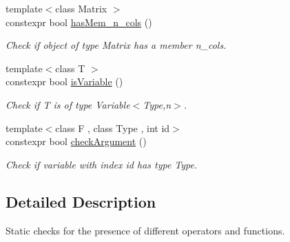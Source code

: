 \begin{DoxyCompactItemize}
{\footnotesize template$<$class Matrix $>$ }\\constexpr bool \hyperlink{group__ConceptCheck_ga0a87aaa714499abcaabd921297be61e4}{has\-Mem\-\_\-n\-\_\-cols} ()
\begin{DoxyCompactList}\small\item\em \-Check if object of type \-Matrix has a member n\-\_\-cols. \end{DoxyCompactList}\item 
{\footnotesize template$<$class T $>$ }\\constexpr bool \hyperlink{group__ConceptCheck_gac2a1a8aedf54c42cb6d47b3b64bbc761}{is\-Variable} ()
\begin{DoxyCompactList}\small\item\em \-Check if \-T is of type \-Variable$<$\-Type,n$>$. \end{DoxyCompactList}\item 
{\footnotesize template$<$class F , class Type , int id$>$ }\\constexpr bool \hyperlink{group__ConceptCheck_ga31790e5d021a40ac34b7469323c658f9}{check\-Argument} ()
\begin{DoxyCompactList}\small\item\em \-Check if variable with index id has type \-Type. \end{DoxyCompactList}\end{DoxyCompactItemize}


\subsection{\-Detailed \-Description}
\-Static checks for the presence of different operators and functions. 